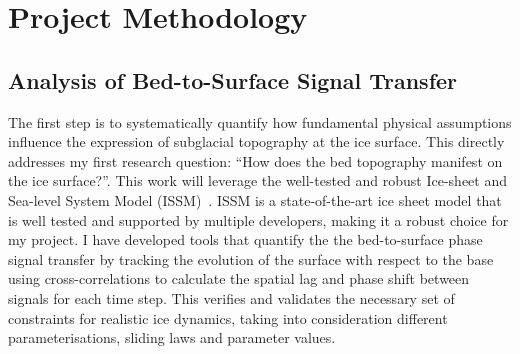 \chapter{Project Methodology}

\section{Analysis of Bed-to-Surface Signal Transfer}\label{paper1}
The first step is to systematically quantify how fundamental physical assumptions influence the expression of subglacial topography at the ice surface.
This directly addresses my first research question: ``How does the bed topography manifest on the ice surface?''. This work will leverage the well-tested and robust Ice-sheet and Sea-level System Model (ISSM)~\cite{Larour_2012}. ISSM is a state-of-the-art ice sheet model that is well tested and supported by multiple developers, making it a robust choice for my project. 
I have developed tools that quantify the the bed-to-surface phase signal transfer by tracking the evolution of the surface with respect to the base using cross-correlations to calculate the spatial lag and phase shift between signals for each time step. This verifies and validates the necessary set of constraints for realistic ice dynamics, taking into consideration different parameterisations, sliding laws and parameter values.

